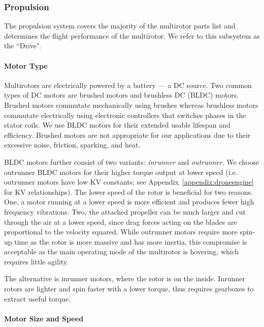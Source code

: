 
\subsubsection{Propulsion}

The propulsion system covers the majority of the multirotor parts list and determines the flight performance of the multirotor. We refer to this subsystem as the ``Drive".
\paragraph{Motor Type}
Multirotors are electrically powered by a battery --- a DC source. Two common types of DC motors are  brushed motors and brushless DC (BLDC) motors. Brushed motors commutate mechanically using brushes whereas brushless motors commutate electrically using electronic controllers that switches phases in the stator coils. We use BLDC motors for their extended usable lifespan and efficiency. Brushed motors are not appropriate for our applications due to their excessive noise, friction, sparking, and heat.

BLDC motors further consist of two variants: \textit{inrunner} and \textit{outrunner}. We choose outrunner BLDC motors for their higher torque output at lower speed  (i.e. outrunner motors have low KV constants; see Appendix~\ref{appendix:droneengine} for KV relationships). The lower speed of the rotor is beneficial for two reasons. One, a motor running at a lower speed is more efficient and produces fewer high frequency vibrations. Two, the attached propeller can be much larger and cut through the air at a lower speed, since drag forces acting on the blades are proportional to the velocity squared. While outrunner motors require more spin-up time as the rotor is more massive and has more inertia, this compromise is acceptable as the main operating mode of the multirotor is hovering, which requires little agility. 

The alternative is inrunner motors, where the rotor is on the inside. Inrunner rotors are lighter and spin faster with a lower torque, thus requires gearboxes to extract useful torque\cite{invsoutrunner}.

\paragraph{Motor Size and Speed}\label{section:motor-speed}

